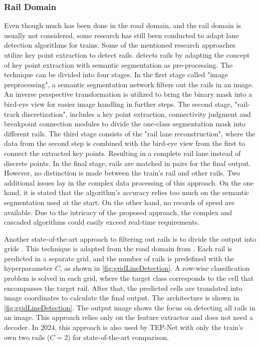 \subsubsection{Rail Domain}

Even though much has been done in the road domain, and the rail domain is usually not considered, some research has still been conducted to adapt lane detection algorithms for trains.
Some of the mentioned research approaches utilize key point extraction to detect rails.
\cite{topologyGuidedRailDetection2022} detects rails by adapting the concept of key point extraction with semantic segmentation as pre-processing.
The technique can be divided into four stages.
In the first stage called "image preprocessing", a semantic segmentation network filters out the rails in an image.
An inverse perspective transformation is utilized to bring the binary mask into a bird-eye view for easier image handling in further steps.
The second stage, "rail-track discretization", includes a key point extraction, connectivity judgment and breakpoint connection modules to divide the one-class segmentation mask into different rails.
The third stage consists of the "rail lane reconstruction", where the data from the second step is combined with the bird-eye view from the first to connect the extracted key points. Resulting in a complete rail lane instead of discrete points.
In the final stage, rails are matched in pairs for the final output.
However, no distinction is made between the train's rail and other rails.
Two additional issues lay in the complex data processing of this approach.
On the one hand, it is stated that the algorithm's accuracy relies too much on the semantic segmentation used at the start.
On the other hand, no records of speed are available.
Due to the intricacy of the proposed approach, the complex and cascaded algorithms could easily exceed real-time requirements.


Another state-of-the-art approach to filtering out rails is to divide the output into grids \cite{li2022rail}.
This technique is adapted from the road domain from \cite{laneDetectionGrid2020}.
Each rail is predicted in a separate grid, and the number of rails is predefined with the hyperparameter $C$, as shown in \autoref{fig:gridLineDetection}.
A row-wise classification problem is solved in each grid, where the target class corresponds to the cell that encompasses the target rail.
After that, the predicted cells are translated into image coordinates to calculate the final output.
The architecture is shown in \autoref{fig:gridLineDetection}.
The output image shows the focus on detecting all rails in an image.
This approach relies only on the feature extractor and does not need a decoder.
In 2024, this approach is also used by TEP-Net \cite{tepNet2024} with only the train's own two rails ($C=2$) for state-of-the-art comparison.

